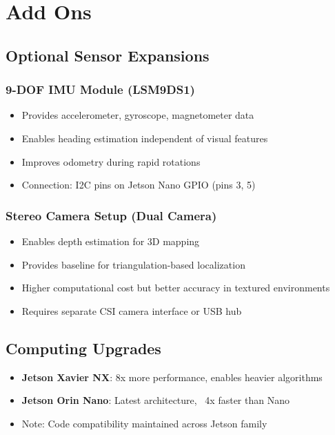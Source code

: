 %
%

\chapter{Add Ons}

\section{Optional Sensor Expansions}

\subsection{9-DOF IMU Module (LSM9DS1)}
\begin{itemize}
    \item Provides accelerometer, gyroscope, magnetometer data
    \item Enables heading estimation independent of visual features
    \item Improves odometry during rapid rotations
    \item Connection: I2C pins on Jetson Nano GPIO (pins 3, 5)
\end{itemize}

\subsection{Stereo Camera Setup (Dual Camera)}
\begin{itemize}
    \item Enables depth estimation for 3D mapping
    \item Provides baseline for triangulation-based localization
    \item Higher computational cost but better accuracy in textured environments
    \item Requires separate CSI camera interface or USB hub
\end{itemize}

\section{Computing Upgrades}

\begin{itemize}
    \item \textbf{Jetson Xavier NX}: 8x more performance, enables heavier algorithms
    \item \textbf{Jetson Orin Nano}: Latest architecture, ~4x faster than Nano
    \item Note: Code compatibility maintained across Jetson family
\end{itemize}

